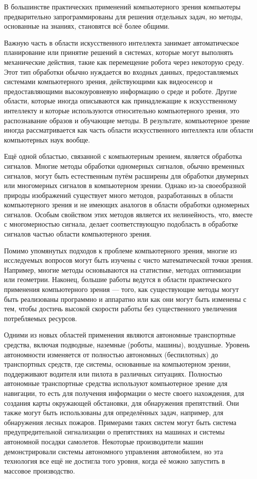 \documentclass[a4paper,14pt]{extreport}
\begin{document}
В большинстве практических применений компьютерного зрения компьютеры предварительно запрограммированы для решения отдельных задач, но методы, основанные на знаниях, становятся всё более общими. 

Важную часть в области искусственного интеллекта занимает автоматическое планирование или принятие решений в системах, которые могут выполнять механические действия, такие как перемещение робота через некоторую среду. Этот тип обработки обычно нуждается во входных данных, предоставляемых системами компьютерного зрения, действующими как видеосенсор и предоставляющими высокоуровневую информацию о среде и роботе. Другие области, которые иногда описываются как принадлежащие к искусственному интеллекту и которые используются относительно компьютерного зрения, это распознавание образов и обучающие методы. В результате, компьютерное зрение иногда рассматривается как часть области искусственного интеллекта или области компьютерных наук вообще.

Ещё одной областью, связанной с компьютерным зрением, является обработка сигналов. Многие методы обработки одномерных сигналов, обычно временных сигналов, могут быть естественным путём расширены для обработки двумерных или многомерных сигналов в компьютерном зрении. Однако из-за своеобразной природы изображений существует много методов, разработанных в области компьютерного зрения и не имеющих аналогов в области обработки одномерных сигналов. Особым свойством этих методов является их нелинейность, что, вместе с многомерностью сигнала, делает соответствующую подобласть в обработке сигналов частью области компьютерного зрения.

Помимо упомянутых подходов к проблеме компьютерного зрения, многие из исследуемых вопросов могут быть изучены с чисто математической точки зрения. Например, многие методы основываются на статистике, методах оптимизации или геометрии. Наконец, большие работы ведутся в области практического применения компьютерного зрения — того, как существующие методы могут быть реализованы программно и аппаратно или как они могут быть изменены с тем, чтобы достичь высокой скорости работы без существенного увеличения потребляемых ресурсов.

Одними из новых областей применения являются автономные транспортные средства, включая подводные, наземные (роботы, машины), воздушные. Уровень автономности изменяется от полностью автономных (беспилотных) до транспортных средств, где системы, основанные на компьютерном зрении, поддерживают водителя или пилота в различных ситуациях. Полностью автономные транспортные средства используют компьютерное зрение для навигации, то есть для получения информации о месте своего нахождения, для создания карты окружающей обстановки, для обнаружения препятствий. Они также могут быть использованы для определённых задач, например, для обнаружения лесных пожаров. Примерами таких систем могут быть система предупредительной сигнализации о препятствиях на машинах и системы автономной посадки самолетов. Некоторые производители машин демонстрировали системы автономного управления автомобилем, но эта технология все ещё не достигла того уровня, когда её можно запустить в массовое производство.
\end{document}
